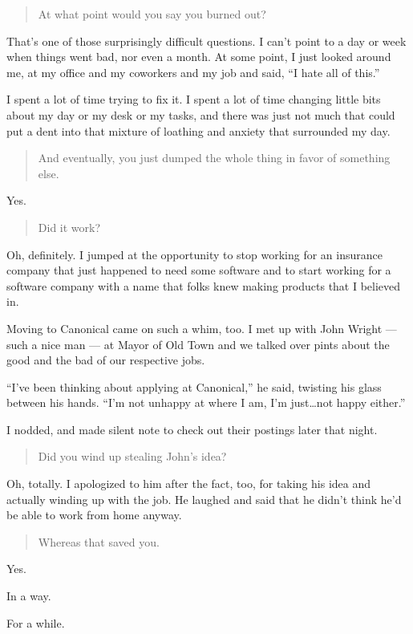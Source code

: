 \begin{quote}
At what point would you say you burned out?
\end{quote}

That's one of those surprisingly difficult questions. I can't point to a day or week when things went bad, nor even a month. At some point, I just looked around me, at my office and my coworkers and my job and said, ``I hate all of this.''

I spent a lot of time trying to fix it. I spent a lot of time changing little bits about my day or my desk or my tasks, and there was just not much that could put a dent into that mixture of loathing and anxiety that surrounded my day.

\begin{quote}
And eventually, you just dumped the whole thing in favor of something else.
\end{quote}

Yes.

\begin{quote}
Did it work?
\end{quote}

Oh, definitely. I jumped at the opportunity to stop working for an insurance company that just happened to need some software and to start working for a software company with a name that folks knew making products that I believed in.

Moving to Canonical came on such a whim, too. I met up with John Wright --- such a nice man --- at Mayor of Old Town and we talked over pints about the good and the bad of our respective jobs.

``I've been thinking about applying at Canonical,'' he said, twisting his glass between his hands. ``I'm not unhappy at where I am, I'm just\ldots{}not happy either.''

I nodded, and made silent note to check out their postings later that night.

\begin{quote}
Did you wind up stealing John's idea?
\end{quote}

Oh, totally. I apologized to him after the fact, too, for taking his idea and actually winding up with the job. He laughed and said that he didn't think he'd be able to work from home anyway.

\begin{quote}
Whereas that saved you.
\end{quote}

Yes.

In a way.

For a while.
